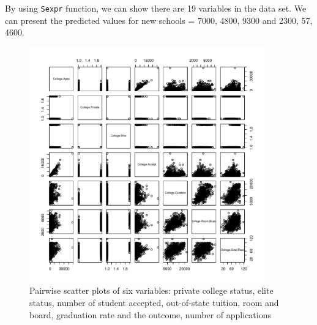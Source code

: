\documentclass{article}\usepackage[]{graphicx}\usepackage[]{color}
\newenvironment{knitrout}{}{} %
\begin{document}
By using {\tt Sexpr} function, we can show there are 19 variables in the data set. We can present the predicted values for new schools = 7000, 4800, 9300 and 2300, 57, 4600.


\begin{figure}
\begin{center}
\begin{knitrout}
\color{fgcolor}
\includegraphics[width=4in]{figure/unnamed-chunk-2-1} 

\end{knitrout}

\caption{Pairwise scatter plots of six variables: private college status, elite status, number of student accepted, out-of-state tuition, room and board, graduation rate and the outcome, number of applications}
\label{pairs}
\end{center}
\end{figure}

\end{document}
